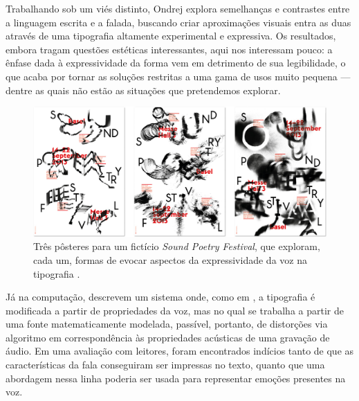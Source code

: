 \documentclass[a4paper,11pt,titlepage,singlespacing]{article}
\begin{document}
    
    
   	Trabalhando sob um viés distinto, Ondrej  explora semelhanças e contrastes entre a linguagem escrita e a falada, buscando criar aproximações visuais entra as duas através de uma tipografia altamente experimental e expressiva. Os resultados, embora tragam questões estéticas interessantes, aqui nos interessam pouco: a ênfase dada à expressividade da forma vem em detrimento de sua legibilidade, o que acaba por tornar as soluções restritas a uma gama de usos muito pequena — dentre as quais não estão as situações que pretendemos explorar.
    
    
    
\begin{figure}[!ht]
    
    \centering
    \label{fig:exemplo}
    \captionsetup{width=\textwidth}
    \includegraphics[width=1\textwidth]{fig/ondrej_jelinek_posters.jpg}
        
    \caption{Três pôsteres para um fictício \textit{Sound Poetry Festival}, que exploram, cada um, formas de evocar aspectos da expressividade da voz na tipografia \cite{ondrej}.}
\end{figure}


    Já na computação,  descrevem um sistema onde, como em , a tipografia é modificada a partir de propriedades da voz, mas no qual se trabalha a partir de uma fonte matematicamente modelada, passível, portanto, de distorções via algoritmo em correspondência às propriedades acústicas de uma gravação de áudio. Em uma avaliação com leitores, foram encontrados indícios tanto de que as características da fala conseguiram ser impressas no texto, quanto que uma abordagem nessa linha poderia ser usada para representar emoções presentes na voz.
    
\end{document}
